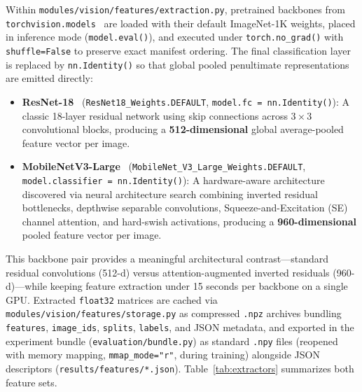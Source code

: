 \documentclass[12pt,a4paper]{article}
\newcommand{\code}[1]{\texttt{#1}}
\begin{document}
Within \code{modules/\allowbreak{}vision/\allowbreak{}features/\allowbreak{}extraction.py}, pretrained backbones from \code{torchvision.models}~\cite{paszke2019pytorch} are loaded with their default ImageNet-1K weights, placed in inference mode (\code{model.eval()}), and executed under \code{torch.no\_\allowbreak{}grad()} with \code{shuffle=False} to preserve exact manifest ordering. The final classification layer is replaced by \code{nn.Identity()} so that global pooled penultimate representations are emitted directly:
\begin{itemize}[leftmargin=18pt, itemsep=2pt]
  \item \textbf{ResNet-18}~\cite{he2016resnet} (\code{ResNet18\_\allowbreak{}Weights.DEFAULT}, \code{model.fc = nn.Identity()}): A classic 18-layer residual network using skip connections across $3 \times 3$ convolutional blocks, producing a \textbf{512-dimensional} global average-pooled feature vector per image.
  \item \textbf{MobileNetV3-Large}~\cite{howard2019mobilenetv3} (\code{MobileNet\_\allowbreak{}V3\_\allowbreak{}Large\_\allowbreak{}Weights.DEFAULT}, \code{model.classifier = nn.Identity()}): A hardware-aware architecture discovered via neural architecture search combining inverted residual bottlenecks, depthwise separable convolutions, Squeeze-and-Excitation (SE) channel attention, and hard-swish activations, producing a \textbf{960-dimensional} pooled feature vector per image.
\end{itemize}

This backbone pair provides a meaningful architectural contrast---standard residual convolutions (512-d) versus attention-augmented inverted residuals (960-d)---while keeping feature extraction under 15 seconds per backbone on a single GPU. Extracted \code{float32} matrices are cached via \code{modules/\allowbreak{}vision/\allowbreak{}features/\allowbreak{}storage.py} as compressed \code{.npz} archives bundling \code{features}, \code{image\_\allowbreak{}ids}, \code{splits}, \code{labels}, and JSON metadata, and exported in the experiment bundle (\code{evaluation/\allowbreak{}bundle.py}) as standard \code{.npy} files (reopened with memory mapping, \code{mmap\_\allowbreak{}mode="r"}, during training) alongside JSON descriptors (\code{results/\allowbreak{}features/\allowbreak{}*.json}). Table~\ref{tab:extractors} summarizes both feature sets.
\end{document}
